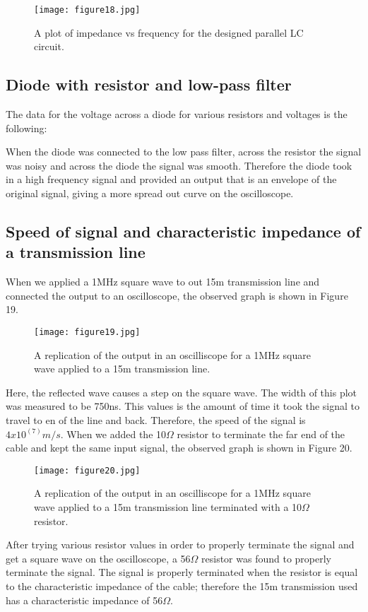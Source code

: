 \documentclass[12pt]{article}
\begin{document}
\begin {figure}[!h]
\centering
\texttt{[image: figure18.jpg]}
\caption{\label{rvd} A plot of impedance vs frequency for the designed
parallel LC circuit.}
\end {figure}

\subsection {Diode with resistor and low-pass filter}
The data for the voltage across a diode for various resistors and
voltages is the following:

When the diode was connected to the low pass filter, across the resistor
the signal was noisy and across the diode the signal was
smooth. Therefore the diode took in a high frequency signal and provided
an output that is an envelope of the original signal, giving a more
spread out curve on the oscilloscope. 

\subsection {Speed of signal and characteristic impedance of a
transmission line}
When we applied a 1MHz square wave to out 15m transmission line and
connected the output to an oscilloscope, the observed graph is shown in
Figure 19.

\begin {figure}[!h]
\centering
\texttt{[image: figure19.jpg]}
\caption{\label{rvd} A replication of the output in an oscilliscope for
a 1MHz square wave applied to a 15m transmission line.}
\end {figure}

Here, the reflected wave causes a step on the square wave. The width of
this plot was measured to be 750ns. This values is the amount of time it
took the signal to travel to en of the line and back. Therefore, the
speed of the signal is $4x10^(7)m/s$. When we added the 10$\Omega$
resistor to terminate the far end of the cable and kept the same input
signal, the observed graph is shown in Figure 20.

\begin {figure}[!h]
\centering
\texttt{[image: figure20.jpg]}
\caption{\label{rvd} A replication of the output in an oscilliscope for
a 1MHz square wave applied to a 15m transmission line terminated with a
10$\Omega$ resistor.}
\end {figure}

After trying various resistor values in order to properly terminate the
signal and get a square wave on the oscilloscope, a 56$\Omega$ resistor was
found to properly terminate the signal. The signal is properly
terminated when the resistor is equal to the characteristic impedance of
the cable; therefore the 15m transmission used has a characteristic
impedance of 56$\Omega$. 
\end{document}
